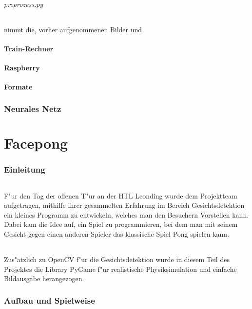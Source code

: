 \documentclass[12pt]{article}
\begin{document}
\paragraph{preprozess.py}
nimmt die, vorher aufgenommenen Bilder und 
\subsection{Train-Rechner}
\subsection{Raspberry}
\subsection{Formate}
\label{formats}

\section{Neurales Netz}


\part{Facepong}
\section{Einleitung}
\paragraph{}
F"ur den Tag der offenen T"ur an der HTL Leonding wurde dem Projektteam
aufgetragen, mithilfe ihrer gesammelten Erfahrung im Bereich Gesichtsdetektion
ein kleines Programm zu entwickeln, welches man den Besuchern Vorstellen kann.
Dabei kam die Idee auf, ein Spiel zu programmieren, bei dem man mit seinem Gesicht
gegen einen anderen Spieler das klassische Spiel \glqq Pong\grqq{} spielen kann.
\paragraph{}
Zus"atzlich zu OpenCV f"ur die Gesichtsdetektion wurde in diesem Teil des Projektes
die Library PyGame f"ur realistische Physiksimulation und einfache Bildausgabe
herangezogen.
\section{Aufbau und Spielweise}
\end{document}
